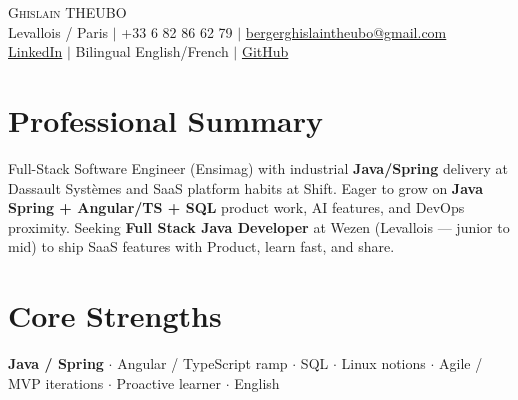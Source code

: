 \documentclass[letterpaper,10.5pt]{article}
\begin{document}
\begin{center}
{\Huge \scshape Ghislain THEUBO} \\ \vspace{2pt}
\small Levallois / Paris $|$ +33 6 82 86 62 79 $|$ \href{mailto:bergerghislaintheubo@gmail.com}{bergerghislaintheubo@gmail.com} \\
\href{https://www.linkedin.com/in/berger-ghislain}{LinkedIn} $|$ Bilingual English/French $|$ \href{https://github.com/Bergerghislain}{GitHub}
\end{center}
\vspace{-6pt}
\section{Professional Summary}
\small{Full-Stack Software Engineer (Ensimag) with industrial \textbf{Java/Spring} delivery at Dassault Syst\`emes and SaaS platform habits at Shift. Eager to grow on \textbf{Java Spring + Angular/TS + SQL} product work, AI features, and DevOps proximity. Seeking \textbf{Full Stack Java Developer} at Wezen (Levallois --- junior to mid) to ship SaaS features with Product, learn fast, and share.}
\section{Core Strengths}
\small{\textbf{Java / Spring} $\cdot$ Angular / TypeScript ramp $\cdot$ SQL $\cdot$ Linux notions $\cdot$ Agile / MVP iterations $\cdot$ Proactive learner $\cdot$ English}
\end{document}
